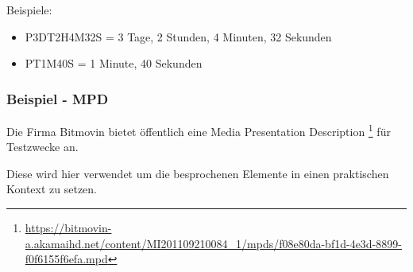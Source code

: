 \documentclass[paper = a4, fontsize = 12pt, parskip = half]{scrartcl} %
\begin{document}
Beispiele:

\begin{itemize}
	\item P3DT2H4M32S = 3 Tage, 2 Stunden, 4 Minuten, 32 Sekunden
	\item PT1M40S = 1 Minute, 40 Sekunden
\end{itemize}

\subsubsection{Beispiel - MPD}
 Die Firma Bitmovin bietet öffentlich eine Media Presentation Description \footnote{\url{https://bitmovin-a.akamaihd.net/content/MI201109210084_1/mpds/f08e80da-bf1d-4e3d-8899-f0f6155f6efa.mpd}} für Testzwecke an. 
 
 Diese wird hier verwendet um die besprochenen Elemente in einen praktischen Kontext zu setzen.
\end{document}
